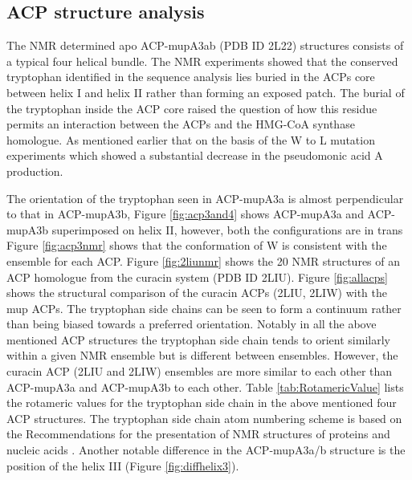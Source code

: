 	\subsection{ACP structure analysis}
	\label{sec:ACPStructureAnalysis}
	The NMR determined apo ACP-mupA3ab (PDB ID 2L22) structures consists of a typical four helical bundle. The NMR experiments showed that the conserved tryptophan identified in the sequence analysis lies buried in the ACPs core between helix I and helix II rather than forming an exposed patch. The burial of the tryptophan inside the ACP core raised the question of how this residue permits an interaction between the ACPs and the HMG-CoA synthase homologue. As mentioned earlier that on the basis of the W to L mutation experiments which showed a substantial decrease in the pseudomonic acid A production.
	
	The orientation of the tryptophan seen in ACP-mupA3a is almost perpendicular to  that in ACP-mupA3b, Figure \ref{fig:acp3and4} shows ACP-mupA3a and ACP-mupA3b superimposed on helix II, however, both the configurations are in trans Figure \ref{fig:acp3nmr} shows that the conformation of W is consistent with the ensemble for each ACP. Figure \ref{fig:2liunmr} shows the 20 NMR structures of an ACP homologue from the curacin system (PDB ID 2LIU). Figure \ref{fig:allacps} shows the structural comparison of the curacin ACPs (2LIU, 2LIW) with the mup ACPs. The tryptophan side chains can be seen to form a continuum rather than being biased towards a preferred orientation. Notably in all the above mentioned ACP structures the tryptophan side chain tends to orient similarly within a given NMR ensemble but is different between ensembles. However, the curacin ACP (2LIU and 2LIW) ensembles are more similar to each other than ACP-mupA3a and ACP-mupA3b to each other.  Table \ref{tab:RotamericValue} lists the rotameric values for the tryptophan side chain in the above mentioned four ACP structures. The tryptophan side chain atom numbering scheme is based on the Recommendations for the presentation of NMR structures of proteins and nucleic acids \parencite{Markley1998}. Another notable difference in the ACP-mupA3a/b structure is the position of the helix III (Figure \ref{fig:diffhelix3}).
	
